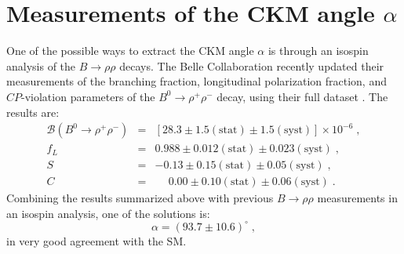 \section{Measurements of the CKM angle $\alpha$}
\label{sec:alpha}

One of the possible ways to extract the CKM angle $\alpha$ is through
an isospin analysis of the $B \to \rho\rho$ decays. The Belle Collaboration
recently updated their measurements of the branching fraction, longitudinal
polarization fraction, and $CP$-violation parameters of the $B^0 \to \rho^+\rho^-$
decay, using their full dataset \cite{belle_rhorho}. The results are:
\begin{eqnarray}
  \mathcal{B} (B^0 \to \rho^+\rho^-) & = & [28.3 \pm 1.5 (\mbox{stat}) \pm 1.5 (\mbox{syst})] \times 10^{-6} \; , \\ 
  f_L & = & 0.988 \pm 0.012 (\mbox{stat}) \pm 0.023 (\mbox{syst}) \; , \\
  S & = & -0.13 \pm 0.15 (\mbox{stat}) \pm 0.05 (\mbox{syst}) \; , \\
  C & = & \phantom{-}0.00 \pm 0.10 (\mbox{stat}) \pm 0.06 (\mbox{syst}) \; .
\end{eqnarray}
Combining the results summarized above with previous $B \to \rho\rho$
measurements in an isospin analysis, one of the solutions is:
\begin{equation}
  \alpha = (93.7 \pm 10.6)^{\circ} \; ,
\end{equation}
in very good agreement with the SM.
